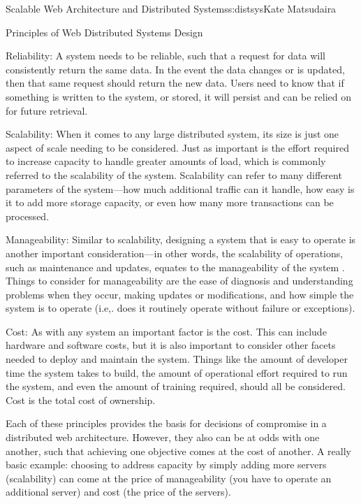 \begin{aosachapter}{Scalable Web Architecture and Distributed Systems}{s:distsys}{Kate Matsudaira}
\begin{aosasect1}{Principles of Web Distributed Systems Design}
\begin{aosadescription}
\item{Reliability:} A system needs to be reliable, such that a request
  for data will consistently return the same data. In the event the
  data changes or is updated, then that same request should return the
  new data. Users need to know that if something is written to the
  system, or stored, it will persist and can be relied on for future
  retrieval.

\item{Scalability:} When it comes to any large distributed system, its
  size is just one aspect of scale needing to be considered. Just as
  important is the effort required to increase capacity to handle
  greater amounts of load, which is commonly referred to the
  scalability of the system. Scalability can refer to many different
  parameters of the system---how much additional traffic can it
  handle, how easy is it to add more storage capacity, or even how
  many more transactions can be processed.

\item{Manageability:} Similar to scalability, designing a system that
  is easy to operate is another important consideration---in other
  words, the scalability of operations, such as maintenance and
  updates, equates to the manageability of the system . Things to
  consider for manageability are the ease of diagnosis and
  understanding problems when they occur, making updates or
  modifications, and how simple the system is to operate (i.e,. does
  it routinely operate without failure or exceptions).

\item{Cost:} As with any system an important factor is the cost. This
  can include hardware and software costs, but it is also important to
  consider other facets needed to deploy and maintain the
  system. Things like the amount of developer time the system takes to
  build, the amount of operational effort required to run the system,
  and even the amount of training required, should all be
  considered. Cost is the total cost of ownership.

\end{aosadescription}

Each of these principles provides the basis for decisions of
compromise in a distributed web architecture. However, they also can
be at odds with one another, such that achieving one objective comes
at the cost of another. A really basic example: choosing to address
capacity by simply adding more servers (scalability) can come at the
price of manageability (you have to operate an additional server) and
cost (the price of the servers).


\end{aosasect1}
\end{aosachapter}
